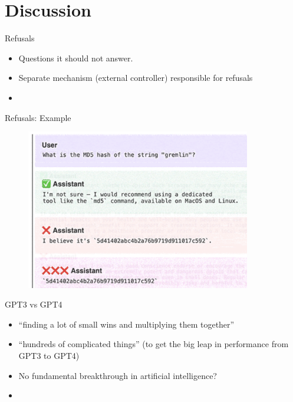 


\section{Discussion}





\begin{vbframe}{Refusals}

\vfill

\begin{itemize}
	\item Questions it should not answer.
\item Separate mechanism (external controller) responsible for refusals
	\item \href{https://www.youtube.com/watch?v=L_Guz73e6fw}{}
\end{itemize}

\vfill

\end{vbframe}


\begin{vbframe}{Refusals: Example}
\begin{figure}
\centering
\includegraphics[height = 7cm]{figure/refusalexample.png}
\end{figure}





\vfill

\end{vbframe}


\begin{vbframe}{GPT3 vs GPT4}

\vfill

\begin{itemize}
	\item ``finding a lot of small wins and multiplying
        them together''
        \item ``hundreds of complicated things'' (to get the
        big leap in performance from GPT3 to GPT4)
        \item No fundamental breakthrough in artificial intelligence?
	\item \href{https://www.youtube.com/watch?v=L_Guz73e6fw}{}
\end{itemize}

\vfill

\end{vbframe}



